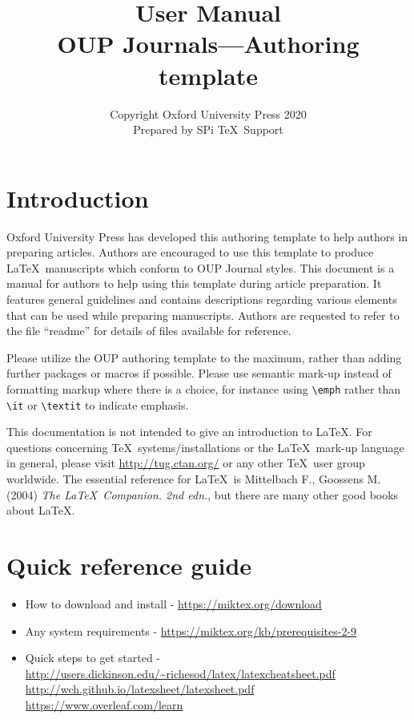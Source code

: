 \documentclass{article}
\begin{document}
\title{\bfseries User Manual\\
OUP Journals---Authoring template}

\author{Copyright Oxford University Press 2020\\
\small Prepared by SPi \TeX\ Support}


\maketitle

\tableofcontents

\section{Introduction }
Oxford University Press has developed this authoring template to
help authors in preparing articles. Authors are encouraged to use
this template to produce \LaTeX\ manuscripts which conform to OUP
Journal styles. This document is a manual for authors to help using
this template during article preparation. It features general
guidelines and contains descriptions regarding various elements that
can be used while preparing manuscripts. Authors are requested to
refer to the file ``readme'' for details of files available for
reference.

Please utilize the OUP authoring template to the maximum, rather
than adding further packages or macros if possible. Please use
semantic mark-up instead of formatting markup where there is a
choice, for instance using \verb+\emph+ rather than \verb+\it+ or
\verb+\textit+ to indicate emphasis.

This documentation is not intended to give an introduction to \LaTeX. For questions concerning \TeX\ systems/installations or the \LaTeX\ mark-up language in general, please visit \url{http://tug.ctan.org/} or any other \TeX\ user group worldwide. The essential reference for \LaTeX\ is Mittelbach F., Goossens M. (2004) \textit{The \LaTeX\ Companion. 2nd edn.}, but there are many other good books about \LaTeX.

\section{Quick reference guide}
\begin{itemize}
\item How to download and install - \url{https://miktex.org/download}
\item Any system requirements - \url{https://miktex.org/kb/prerequisites-2-9}
\item Quick steps to get started - \url{http://users.dickinson.edu/~richesod/latex/latexcheatsheet.pdf}\newline
\url{http://wch.github.io/latexsheet/latexsheet.pdf}\newline
\url{https://www.overleaf.com/learn}
\end{itemize}
\end{document}

